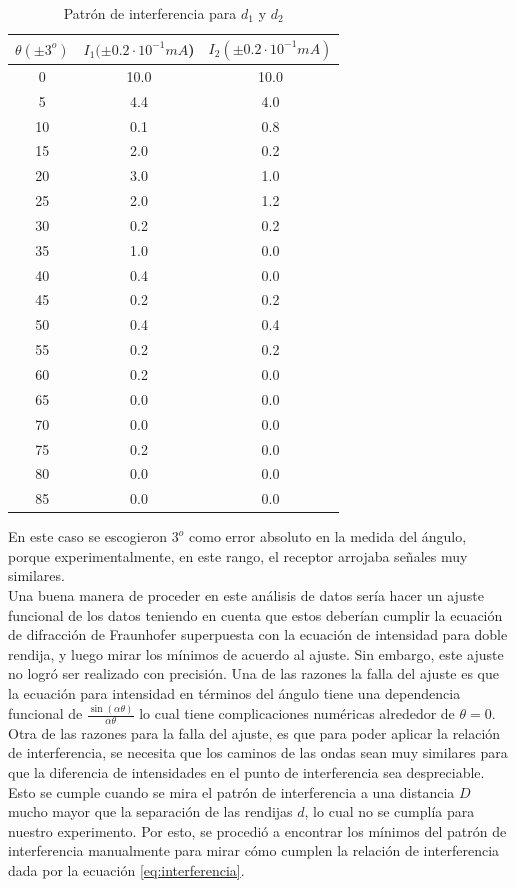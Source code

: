 \documentclass[%
 reprint,
 amsmath,amssymb,
 aps,
]{revtex4-1}
\begin{document}
\begin{table}[h!]
\centering
\begin{tabular}{|c|c|c|}
	\hline $ \theta (\pm 3^o) $ & $ I_1(\pm 0.2\cdot 10^{-1}mA  $) &$ I_2(\pm 0.2\cdot 10^{-1}mA)  $  \\ 
	\hline\hline
	0  &  10.0 & 10.0\\
	5  &  4.4 & 4.0\\
	10 &  0.1 & 0.8\\
	15 &  2.0 & 0.2\\
	20 &  3.0 & 1.0\\ 
	25 &  2.0 & 1.2\\ 
	30 &  0.2 & 0.2\\ 
	35 &  1.0 & 0.0\\ 
	40 &  0.4 & 0.0\\ 
	45 &  0.2 & 0.2\\ 
	50 &  0.4 & 0.4\\ 
	55 &  0.2 & 0.2\\ 
	60 &  0.2 & 0.0\\ 
	65 &  0.0 & 0.0\\ 
	70 &  0.0 & 0.0\\ 
	75 &  0.2 & 0.0\\ 
	80 &  0.0 & 0.0\\ 
	85 &  0.0 & 0.0\\ 
	[1ex] 
 \hline
 \end{tabular} 
  \caption{Patrón de interferencia para $d_1$ y $d_2$}
\label{table:inter} 
\end{table}

En este caso se escogieron $3^o$ como error absoluto en la medida del ángulo, porque experimentalmente, en este rango, el receptor arrojaba señales muy similares.\\

Una buena manera de proceder en este análisis de datos sería hacer un ajuste funcional de los datos teniendo en cuenta que estos deberían cumplir la ecuación de difracción de Fraunhofer superpuesta con la ecuación de intensidad para doble rendija, y luego mirar los mínimos de acuerdo al ajuste. Sin embargo, este ajuste no logró ser realizado con precisión. Una de las razones la falla del ajuste es que la ecuación para intensidad en términos del ángulo tiene una dependencia funcional de $\frac{\sin{(\alpha \theta)}}{\alpha\theta}$ lo cual tiene complicaciones numéricas alrededor de $\theta= 0$. Otra de las razones para la falla del ajuste, es que para poder aplicar la relación de interferencia, se necesita que los caminos de las ondas sean muy similares para que la diferencia de intensidades en el punto de interferencia sea despreciable. Esto se cumple cuando se mira el patrón de interferencia a una distancia $D$ mucho mayor que la separación de las rendijas $d$, lo cual no se cumplía para nuestro experimento. Por esto, se procedió a encontrar los mínimos del patrón de interferencia manualmente para mirar cómo cumplen la relación de interferencia dada por la ecuación \ref{eq:interferencia}.\\
\end{document}
